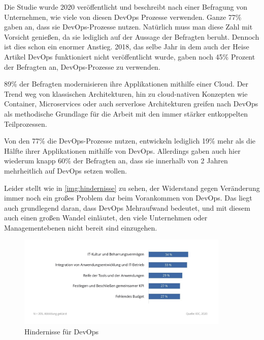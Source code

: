 Die Studie wurde 2020 veröffentlicht und beschreibt nach einer Befragung von Unternehmen, wie viele von diesen \ac{DevOps} Prozesse verwenden. Ganze 77\% gaben an, dass sie \ac{DevOps}-Prozesse nutzen. Natürlich muss man diese Zahl mit Vorsicht genießen, da sie lediglich auf der Aussage der Befragten beruht. Dennoch ist dies schon ein enormer Anstieg. 2018, das selbe Jahr in dem auch der Heise Artikel \glqq \ac{DevOps} funktioniert nicht\grqq \cite{weiss:2018} veröffentlicht wurde, gaben noch 45\% Prozent der Befragten an, \ac{DevOps}-Prozesse zu verwenden.

89\% der Befragten modernisieren ihre Applikationen mithilfe einer Cloud. Der Trend weg von klassischen Architekturen, hin zu cloud-nativen Konzepten wie Container, Microservices oder auch serverlose Architekturen greifen nach \ac{DevOps} als methodische Grundlage für die Arbeit mit den immer stärker entkoppelten Teilprozessen.

Von den 77\% die \ac{DevOps}-Prozesse nutzen, entwickeln lediglich 19\% mehr als die Hälfte ihrer Applikationen mithilfe von \ac{DevOps}. Allerdings gaben auch hier wiederum knapp 60\% der Befragten an, dass sie innerhalb von 2 Jahren mehrheitlich auf \ac{DevOps} setzen wollen.

Leider stellt wie in \autoref{img:hindernisse} zu sehen, der Widerstand gegen Veränderung immer noch ein großes Problem dar beim Vorankommen von \ac{DevOps}. Das liegt auch grundlegend daran, dass \ac{DevOps} Mehraufwand bedeutet, und mit diesem auch einen großen Wandel einläutet, den viele Unternehmen oder Managementebenen nicht bereit sind einzugehen.

\begin{figure}[h]
\centering
\includegraphics[width=0.9\textwidth]{Graphics/idc_hindernisse}
\caption{Hindernisse für \ac{DevOps} \cite{idc:2020}}
\label{img:hindernisse}
\end{figure}

